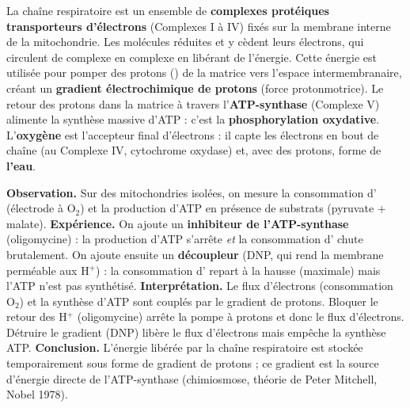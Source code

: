 \documentclass[11pt]{article}
\newcommand{\cle}[1]{{\popxbold\color{popdark}#1}}
\begin{document}
\begin{definition}
La \cle{chaîne respiratoire} est un ensemble de \textbf{complexes protéiques transporteurs d'électrons} (Complexes I à IV) fixés sur la membrane interne de la mitochondrie. Les molécules réduites  et  y cèdent leurs électrons, qui circulent de complexe en complexe en libérant de l'énergie. Cette énergie est utilisée pour pomper des protons () de la matrice vers l'espace intermembranaire, créant un \textbf{gradient électrochimique de protons} (force protonmotrice). Le retour des protons dans la matrice à travers l'\textbf{ATP-synthase} (Complexe V) alimente la synthèse massive d'ATP : c'est la \textbf{phosphorylation oxydative}. L'\textbf{oxygène} est l'accepteur final d'électrons : il capte les électrons en bout de chaîne (au Complexe IV, cytochrome oxydase) et, avec des protons, forme de \textbf{l'eau}.
\end{definition}

\begin{experience}
\textbf{Observation.} Sur des mitochondries isolées, on mesure la consommation d' (électrode à O$_2$) et la production d'ATP en présence de substrats (pyruvate + malate). \textbf{Expérience.} On ajoute un \textbf{inhibiteur de l'ATP-synthase} (oligomycine) : la production d'ATP s'arrête \emph{et} la consommation d' chute brutalement. On ajoute ensuite un \textbf{découpleur} (DNP, qui rend la membrane perméable aux H$^+$) : la consommation d' repart à la hausse (maximale) mais l'ATP n'est pas synthétisé. \textbf{Interprétation.} Le flux d'électrons (consommation O$_2$) et la synthèse d'ATP sont couplés par le gradient de protons. Bloquer le retour des H$^+$ (oligomycine) arrête la pompe à protons et donc le flux d'électrons. Détruire le gradient (DNP) libère le flux d'électrons mais empêche la synthèse ATP. \textbf{Conclusion.} L'énergie libérée par la chaîne respiratoire est stockée temporairement sous forme de gradient de protons ; ce gradient est la source d'énergie directe de l'ATP-synthase (chimiosmose, théorie de Peter Mitchell, Nobel 1978).
\end{experience}
\end{document}
